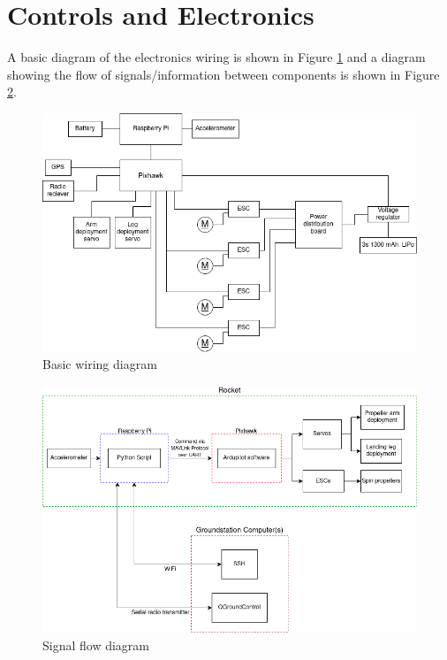 \section{Controls and Electronics}
A basic diagram of the electronics wiring is shown in Figure \ref{cad:wiring} and a diagram showing the flow of signals/information between components is shown in Figure \ref{cad:signal-flow}.
\begin{figure}
    \centering
    \includegraphics[width=\textwidth]{src/figs/electronics_wiring.png}
    \caption{Basic wiring diagram}
    \label{cad:wiring}
\end{figure}

\begin{figure}
    \centering
    \includegraphics[width=\textwidth]{src/figs/signal_flow.png}
    \caption{Signal flow diagram}
    \label{cad:signal-flow}
\end{figure}
